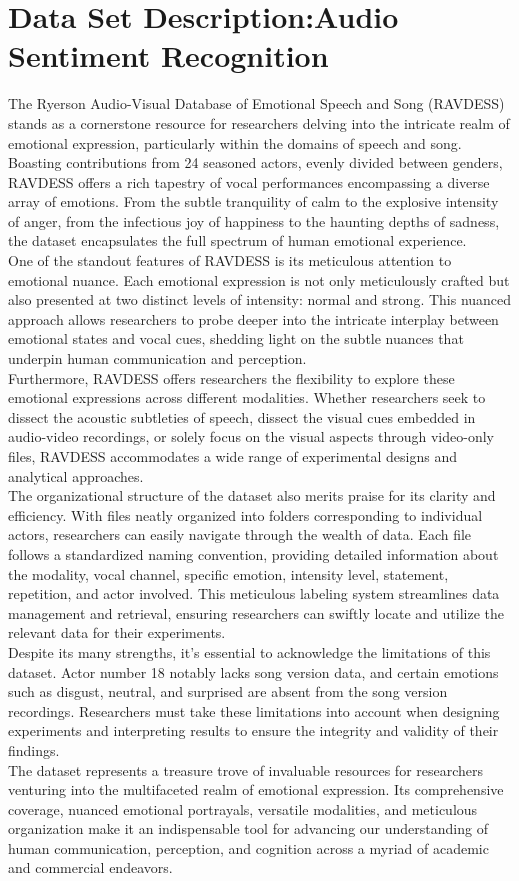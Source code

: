 \section{Data Set Description:Audio Sentiment Recognition}
The Ryerson Audio-Visual Database of Emotional Speech and Song (RAVDESS) stands as a cornerstone resource for researchers delving into the intricate realm of emotional expression, particularly within the domains of speech and song. Boasting contributions from 24 seasoned actors, evenly divided between genders, RAVDESS offers a rich tapestry of vocal performances encompassing a diverse array of emotions. From the subtle tranquility of calm to the explosive intensity of anger, from the infectious joy of happiness to the haunting depths of sadness, the dataset encapsulates the full spectrum of human emotional experience.
\\
One of the standout features of RAVDESS is its meticulous attention to emotional nuance. Each emotional expression is not only meticulously crafted but also presented at two distinct levels of intensity: normal and strong. This nuanced approach allows researchers to probe deeper into the intricate interplay between emotional states and vocal cues, shedding light on the subtle nuances that underpin human communication and perception.
\\
Furthermore, RAVDESS offers researchers the flexibility to explore these emotional expressions across different modalities. Whether researchers seek to dissect the acoustic subtleties of speech, dissect the visual cues embedded in audio-video recordings, or solely focus on the visual aspects through video-only files, RAVDESS accommodates a wide range of experimental designs and analytical approaches.
\\
The organizational structure of the dataset also merits praise for its clarity and efficiency. With files neatly organized into folders corresponding to individual actors, researchers can easily navigate through the wealth of data. Each file follows a standardized naming convention, providing detailed information about the modality, vocal channel, specific emotion, intensity level, statement, repetition, and actor involved. This meticulous labeling system streamlines data management and retrieval, ensuring researchers can swiftly locate and utilize the relevant data for their experiments.
\\
Despite its many strengths, it's essential to acknowledge the limitations of this dataset. Actor number 18 notably lacks song version data, and certain emotions such as disgust, neutral, and surprised are absent from the song version recordings. Researchers must take these limitations into account when designing experiments and interpreting results to ensure the integrity and validity of their findings.
\\
The dataset represents a treasure trove of invaluable resources for researchers venturing into the multifaceted realm of emotional expression. Its comprehensive coverage, nuanced emotional portrayals, versatile modalities, and meticulous organization make it an indispensable tool for advancing our understanding of human communication, perception, and cognition across a myriad of academic and commercial endeavors.
\\
